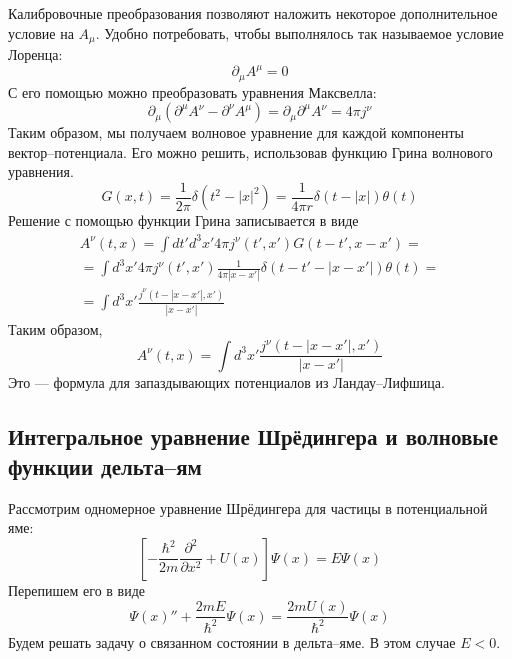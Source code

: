 \documentclass{article}
\begin{document}
Калибровочные преобразования позволяют наложить некоторое дополнительное условие на $A_\mu$.
Удобно потребовать, чтобы выполнялось так называемое условие Лоренца:
\begin{equation}
    \label{lorentz_condition}
    \partial_\mu A^\mu = 0
\end{equation}
С его помощью можно преобразовать уравнения Максвелла:
\begin{equation}
    \partial_\mu (\partial^\mu A^\nu - \partial^\nu A^\mu) = 
        \partial_\mu \partial^\mu A^\nu = 4\pi j^\nu
\end{equation}
Таким образом, мы получаем волновое уравнение для каждой компоненты вектор--потенциала.
Его можно решить, использовав функцию Грина волнового уравнения.
\begin{equation}
    G(x,t) = \frac{1}{2\pi} \delta(t^2 - |x|^2) =
        \frac{1}{4\pi r} \delta(t - |x|)\theta(t)
\end{equation}
Решение с помощью функции Грина записывается в виде
\begin{multline}
    A^\nu(t,x) = \int dt' d^3x'  4\pi j^\nu(t',x') G(t-t',x-x') = \\
        =\int d^3 x' 4\pi j^\nu(t',x') 
            \frac{1}{4\pi |x - x'|} \delta(t-t'-|x-x'|)\theta(t) = \\
            =\int d^3 x' \frac{j^{\nu}(t - |x - x'|, x')}{|x - x'|}
\end{multline}
Таким образом, 
\begin{equation}
   A^\nu(t,x)=\int d^3 x' \frac{j^{\nu}(t - |x - x'|, x')}{|x - x'|}
\end{equation}
Это --- формула для запаздывающих потенциалов из Ландау--Лифшица.

\subsection{Интегральное уравнение Шрёдингера и волновые функции дельта--ям}
Рассмотрим одномерное уравнение Шрёдингера для частицы в потенциальной яме:
\begin{equation}
    \left[-\frac{\hbar^2}{2m} \frac{\partial^2}{\partial x^2} + U(x)\right] \Psi(x) = E\Psi(x)
\end{equation}
Перепишем его в виде
\begin{equation}
    \label{schrodinger_mod}
    \Psi(x)'' + \frac{2mE}{\hbar^2}\Psi(x) = \frac{2mU(x)}{\hbar^2} \Psi(x)
\end{equation}
Будем решать задачу о связанном состоянии в дельта--яме. В этом случае $E < 0$. 
\end{document}
